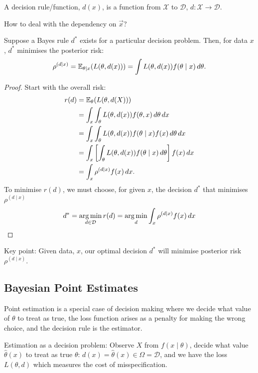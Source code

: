\documentclass[10pt, a4paper]{article}
\begin{document}
\begin{definition}
    A decision rule/function,
    $d(x)$,
    is a function from $\mathcal{X}$ to $\mathcal{D}$,
    $d : \mathcal{X} \to \mathcal{D}$.
\end{definition}

How to deal with the dependency on $\vec{x}$?

\begin{proposition}
    Suppose a Bayes rule $d ^ {*}$ exists for a particular decision problem.
    Then,
    for data $x$,
    $d ^ {*}$ minimises the posterior risk:
    \[
    \rho ^ {(d \mid x)} = \mathbb{E}_{\theta \mid x}(L(\theta, d(x))) = \int L(\theta, d(x))f(\theta \mid x)\,d\theta.
    \]

    \begin{proof}
        Start with the overall risk:
        \begin{align*}
            r(d) &= \mathbb{E}_{\theta}(L(\theta, d(X))) \\
            &= \int_{x}\int_{\theta}L(\theta, d(x))f(\theta, x)\,d\theta\,dx \\
            &= \int_{x}\int_{\theta}L(\theta, d(x))f(\theta \mid x)f(x)\,d\theta\,dx \\
            &= \int_{x}\left[\int_{\theta}L(\theta, d(x))f(\theta \mid x)\,d\theta\right]f(x)\,dx \\
            &= \int_{x}\rho ^ {(d\mid x)}f(x)\,dx.
        \end{align*}
        To minimise $r(d)$,
        we must choose,
        for given $x$,
        the decision $d ^ {*}$ that minimises $\rho ^ {(d\mid x)}$
        \[
        d ^ {*} = \operatorname*{arg\,min}_{d \in \mathcal{D}}r(d) = \operatorname*{arg\,min}_{d}\int_{x}\rho ^ {(d\mid x)}f(x)\,dx
        \]
    \end{proof}
\end{proposition}
Key point:
Given data,
$x$,
our optimal decision $d ^ {*}$ will minimise posterior risk $\rho ^ {(d \mid x)}$.

\subsection{Bayesian Point Estimates}
Point estimation is a special case of decision making where we decide what value of $\theta$ to treat as true,
the loss function arises as a penalty for making the wrong choice,
and the decision rule is the estimator.

Estimation as a decision problem:
Observe $X$ from $f(x \mid \theta)$,
decide what value $\hat{\theta}(x)$ to treat as true $\theta$:
$d(x) = \hat{\theta}(x) \in \Omega = \mathcal{D}$,
and we have the loss $L(\theta, d)$ which measures the cost of misspecification.
\end{document}

